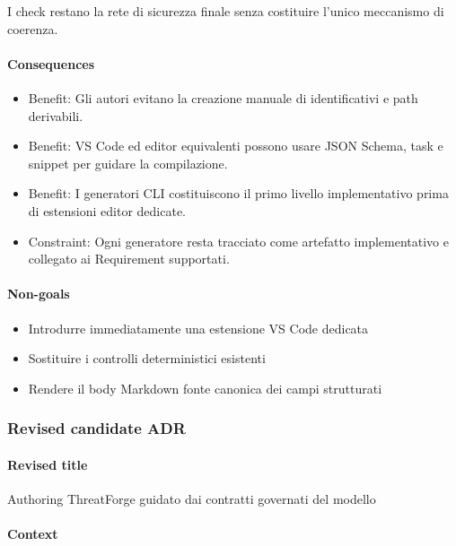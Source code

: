 \documentclass[
  10pt,
]{article}
\providecommand{\tightlist}{%
  \setlength{\itemsep}{0pt}\setlength{\parskip}{0pt}}
\begin{document}
I check restano la rete di sicurezza finale senza costituire l'unico
meccanismo di coerenza.

\paragraph{Consequences}\label{consequences-24}

\begin{itemize}
\tightlist
\item
  Benefit: Gli autori evitano la creazione manuale di identificativi e
  path derivabili.
\item
  Benefit: VS Code ed editor equivalenti possono usare JSON Schema, task
  e snippet per guidare la compilazione.
\item
  Benefit: I generatori CLI costituiscono il primo livello
  implementativo prima di estensioni editor dedicate.
\item
  Constraint: Ogni generatore resta tracciato come artefatto
  implementativo e collegato ai Requirement supportati.
\end{itemize}

\paragraph{Non-goals}\label{non-goals-8}

\begin{itemize}
\tightlist
\item
  Introdurre immediatamente una estensione VS Code dedicata
\item
  Sostituire i controlli deterministici esistenti
\item
  Rendere il body Markdown fonte canonica dei campi strutturati
\end{itemize}

\subsubsection{Revised candidate ADR}\label{revised-candidate-adr-12}

\paragraph{Revised title}\label{revised-title-12}

Authoring ThreatForge guidato dai contratti governati del modello

\paragraph{Context}\label{context-25}
\end{document}
